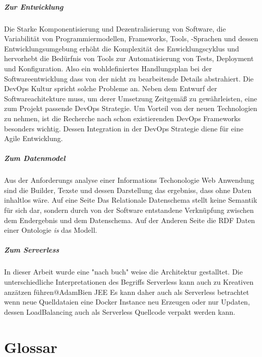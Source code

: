 \documentclass[
12pt,
english,
ngerman,
headsepline,
twoside,
openright,
numbers=noenddot,version=first
]{scrreprt}
\begin{document}
\paragraph{Zur Entwicklung}
Die Starke Komponentisierung und Dezentralisierung von Software, die Variabilität von Programmiermodellen, Frameworks, Tools, -Sprachen und dessen Entwicklungsumgebung erhöht die Komplexität des Enwicklungscyklus und hervorhebt die Bedürfnis von Tools zur Automatisierung von Tests, Deployment und Konfiguration. Also ein wohldefiniertes Handlungsplan bei der Softwareentwicklung dass von der nicht zu bearbeitende Details abstrahiert. 
Die DevOps Kultur spricht solche Probleme an. Neben dem Entwurf der Softwareachitekture  muss, um derer Umsetzung Zeitgemäß zu gewährleisten, eine zum Projekt passende DevOps Strategie.
Um Vorteil von der neuen Technologien zu nehmen, ist die Recherche nach schon existierenden DevOps Frameworks besonders wichtig. Dessen Integration in der DevOps Strategie diene für eine Agile Entwicklung.

\paragraph{Zum Datenmodel}
Aus der Anforderungs analyse einer Informations Techonologie Web Anwendung sind die Builder, Texste und dessen Darstellung das ergebniss, dass ohne Daten inhaltlos wäre. Auf eine Seite Das Relationale Datenschema stellt keine Semantik für sich dar, sondern durch von der Software entstandene Verknüpfung zwischen dem Endergebnis und dem Datenschema. Auf der Anderen Seite die  RDF Daten einer Ontologie \textit{is} das Modell.

\paragraph{Zum Serverless}
In dieser Arbeit wurde eine "nach buch" weise die Architektur gestalltet. Die unterschiedliche Interpretationen des Begriffs Serverless kann auch zu Kreativen anzätzen führen@AdamBien JEE
Es kann daher auch als Serverless betrachtet wenn neue Quelldataien eine Docker Instance neu Erzeugen oder nur Updaten, dessen LoadBalancing auch als Serverless Quellcode verpakt werden kann. 

\lstlistoflistings

\listoffigures

\listoftables



\chapter*{Glossar}
\printglossary[title=Glossar, toctitle=Terminologie]
\printglossary
\end{document}
